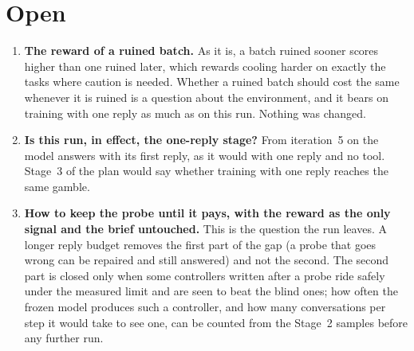 \documentclass[11pt,a4paper]{article}
\begin{document}
\begin{table}[h]
\centering\small

\caption{How soon the ruined batches were ruined and how fast the successful
ones were, with the mean reward of each. A ruined batch scores $-80$ less
0.3 per step taken, a successful one $+120$ less 0.3 per step.}
\label{tab:pace}
\end{table}

\begin{table}[h]
\centering\small
\resizebox{0.92\linewidth}{!}{}
\caption{The probes that printed a number within 0.01 of the limit, followed
to the controller and the final run.}
\label{tab:fate}
\end{table}

\clearpage
\section{Open}

\begin{enumerate}[leftmargin=*, itemsep=0.3em]
\item \textbf{The reward of a ruined batch.} As it is, a batch ruined sooner
  scores higher than one ruined later, which rewards cooling harder on
  exactly the tasks where caution is needed. Whether a ruined batch should
  cost the same whenever it is ruined is a question about the environment,
  and it bears on training with one reply as much as on this run. Nothing
  was changed.
\item \textbf{Is this run, in effect, the one-reply stage?} From iteration~5
  on the model answers with its first reply, as it would with one reply and
  no tool. Stage~3 of the plan would say whether training with one reply
  reaches the same gamble.
\item \textbf{How to keep the probe until it pays, with the reward as the
  only signal and the brief untouched.} This is the question the run leaves.
  A longer reply budget removes the first part of the gap (a probe that goes
  wrong can be repaired and still answered) and not the second. The second
  part is closed only when some controllers written after a probe ride
  safely under the measured limit and are seen to beat the blind ones; how
  often the frozen model produces such a controller, and how many
  conversations per step it would take to see one, can be counted from the
  Stage~2 samples before any further run.
\end{enumerate}
\end{document}
